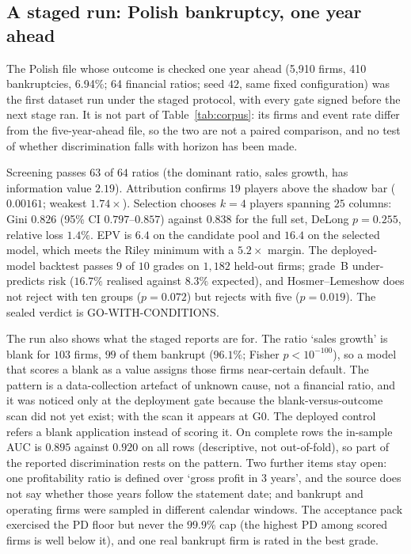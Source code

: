 \documentclass[9pt,journal]{IEEEtai}
\begin{document}
\subsection{A staged run: Polish bankruptcy, one year ahead}\label{sec:polish1}
The Polish file whose outcome is checked one year ahead (5{,}910 firms, 410 bankruptcies, 6.94\%; 64
financial ratios; seed $42$, same fixed configuration) was the first dataset run under the staged
protocol, with every gate signed before the next stage ran. It is not part of Table~\ref{tab:corpus}:
its firms and event rate differ from the five-year-ahead file, so the two are not a paired comparison, and
no test of whether discrimination falls with horizon has been made.

Screening passes $63$ of $64$ ratios (the dominant ratio, sales growth, has information value $2.19$).
Attribution confirms $19$ players above the shadow bar ($0.00161$; weakest $1.74\times$). Selection
chooses $k{=}4$ players spanning $25$ columns: Gini $0.826$ (95\% CI $0.797$--$0.857$) against $0.838$ for
the full set, DeLong $p{=}0.255$, relative loss $1.4\%$. EPV is $6.4$ on the candidate pool and $16.4$ on the
selected model, which meets the Riley minimum with a $5.2\times$ margin. The deployed-model backtest passes
$9$ of $10$ grades on $1{,}182$ held-out firms; grade~B under-predicts risk ($16.7\%$ realised against
$8.3\%$ expected), and Hosmer--Lemeshow does not reject with ten groups ($p{=}0.072$) but rejects with five
($p{=}0.019$). The sealed verdict is GO-WITH-CONDITIONS.

The run also shows what the staged reports are for. The ratio `sales growth' is blank for $103$ firms,
$99$ of them bankrupt ($96.1\%$; Fisher $p<10^{-100}$), so a model that scores a blank as a value assigns
those firms near-certain default. The pattern is a data-collection artefact of unknown cause, not a financial
ratio, and it was noticed only at the deployment gate because the blank-versus-outcome scan did not yet
exist; with the scan it appears at G0. The deployed control refers a blank application instead of scoring it.
On complete rows the in-sample AUC is $0.895$ against $0.920$ on all rows (descriptive, not out-of-fold), so part of the
reported discrimination rests on the pattern. Two further items stay open: one profitability ratio is defined
over `gross profit in 3 years', and the source does not say whether those years follow the statement date; and
bankrupt and operating firms were sampled in different calendar windows. The acceptance pack exercised the PD floor
but never the $99.9\%$ cap (the highest PD among scored firms is well below it), and one real bankrupt firm is
rated in the best grade.
\end{document}
